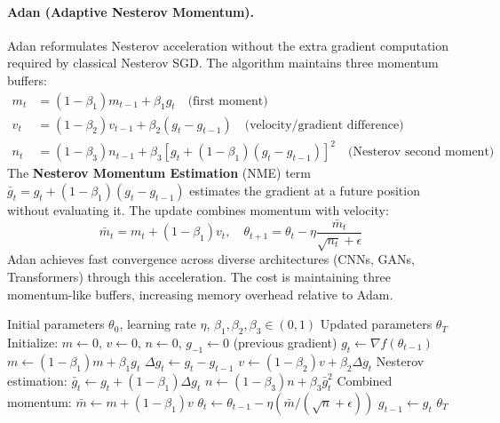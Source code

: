 \documentclass[11pt,a4paper]{article}
\begin{document}
\paragraph{Adan (Adaptive Nesterov Momentum).}
Adan reformulates Nesterov acceleration without the extra gradient computation required by classical Nesterov SGD. The algorithm maintains three momentum buffers:
\begin{align}
m_t &= (1-\beta_1)m_{t-1} + \beta_1 g_t \quad\text{(first moment)} \\
v_t &= (1-\beta_2)v_{t-1} + \beta_2(g_t - g_{t-1}) \quad\text{(velocity/gradient difference)} \\
n_t &= (1-\beta_3)n_{t-1} + \beta_3[g_t + (1-\beta_1)(g_t-g_{t-1})]^2 \quad\text{(Nesterov second moment)}
\end{align}
The \textbf{Nesterov Momentum Estimation} (NME) term $\bar{g}_t = g_t + (1-\beta_1)(g_t-g_{t-1})$ estimates the gradient at a future position without evaluating it. The update combines momentum with velocity:
\[\bar{m}_t = m_t + (1-\beta_1)v_t, \quad \theta_{t+1} = \theta_t - \eta\frac{\bar{m}_t}{\sqrt{n_t}+\epsilon}\]
Adan achieves fast convergence across diverse architectures (CNNs, GANs, Transformers) through this acceleration. The cost is maintaining three momentum-like buffers, increasing memory overhead relative to Adam.

\begin{algorithm}[H]
\caption{Adan (Adaptive Nesterov Momentum)}
\label{alg:adan}
\begin{algorithmic}[1]
\Require Initial parameters $\theta_0$, learning rate $\eta$, $\beta_1, \beta_2, \beta_3 \in (0,1)$
\Ensure Updated parameters $\theta_T$
\State Initialize: $m \gets 0$, $v \gets 0$, $n \gets 0$, $g_{-1} \gets 0$ (previous gradient)
    \State $g_t \gets \nabla f(\theta_{t-1})$
    \State $m \gets (1-\beta_1) m + \beta_1 g_t$
    \State $\Delta g_t \gets g_t - g_{t-1}$
    \State $v \gets (1-\beta_2) v + \beta_2 \Delta g_t$
    \State Nesterov estimation: $\bar{g}_t \gets g_t + (1-\beta_1) \Delta g_t$
    \State $n \gets (1-\beta_3) n + \beta_3 \bar{g}_t^2$
    \State Combined momentum: $\bar{m} \gets m + (1-\beta_1) v$
    \State $\theta_t \gets \theta_{t-1} - \eta (\bar{m} / (\sqrt{n} + \epsilon))$
    \State $g_{t-1} \gets g_t$
\EndFor
\Return $\theta_T$
\end{algorithmic}
\end{algorithm}
\end{document}
